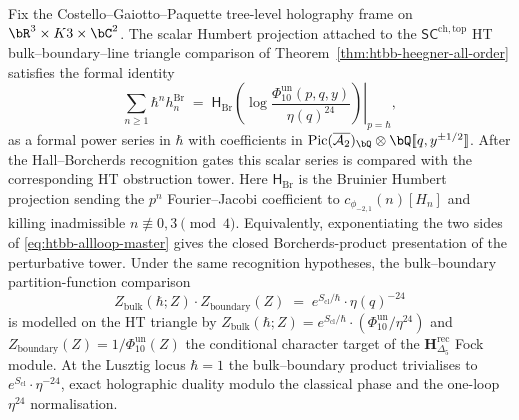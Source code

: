 \begin{theorem}
\label{thm:htbb-allloop-resummation}
Fix the Costello--Gaiotto--Paquette tree-level holography frame on
$\bR^3\times K3\times\bC^2$. The scalar Humbert projection attached to
the $\mathsf{SC}^{\mathrm{ch,top}}$ HT bulk--boundary--line triangle
comparison of
Theorem~\ref{thm:htbb-heegner-all-order} satisfies the formal identity
\begin{equation}\label{eq:htbb-allloop-master}
 \sum_{n\geq 1}\hbar^n h_n^{\mathrm{Br}}
 \;=\;
 \left.
 \mathsf H_{\mathrm{Br}}\!
 \left(\log\frac{\Phi_{10}^{\mathrm{un}}(p,q,y)}{\eta(q)^{24}}\right)
 \right|_{p=\hbar},
\end{equation}
as a formal power series in $\hbar$ with coefficients in
$\mathrm{Pic}(\overline{\mathcal A_2})_\bQ\otimes\bQ[\![q, y^{\pm 1/2}]\!]$.
After the Hall--Borcherds recognition gates this scalar series is
compared with the corresponding HT obstruction tower. Here
$\mathsf H_{\mathrm{Br}}$ is the Bruinier Humbert projection sending
the $p^n$ Fourier--Jacobi coefficient to
$c_{\phi_{-2,1}}(n)[H_n]$ and killing inadmissible
$n\not\equiv0,3\pmod4$. Equivalently, exponentiating the two sides of
\eqref{eq:htbb-allloop-master} gives the closed Borcherds-product
presentation of the perturbative tower. Under the same recognition
hypotheses, the bulk--boundary partition-function comparison
\begin{equation}\label{eq:htbb-allloop-bulk-boundary}
 Z_{\mathrm{bulk}}(\hbar; Z) \cdot Z_{\mathrm{boundary}}(Z)
 \;=\; e^{S_{\mathrm{cl}}/\hbar}\cdot\eta(q)^{-24}
\end{equation}
is modelled on the HT triangle by $Z_{\mathrm{bulk}}(\hbar; Z) =
e^{S_{\mathrm{cl}}/\hbar}\cdot(\Phi_{10}^{\mathrm{un}}/\eta^{24})$ and
$Z_{\mathrm{boundary}}(Z) = 1/\Phi_{10}^{\mathrm{un}}(Z)$ the
conditional character target of the
$\mathbf{H}_{\Delta_5}^{\mathrm{rec}}$ Fock module. At the Lusztig locus
$\hbar = 1$ the bulk--boundary product trivialises to
$e^{S_{\mathrm{cl}}}\cdot\eta^{-24}$, exact holographic duality
modulo the classical phase and the one-loop $\eta^{24}$ normalisation.
\end{theorem}

